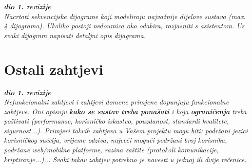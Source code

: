 				\textbf{\textit{dio 1. revizije}}\\
				
				\textit{Nacrtati sekvencijske dijagrame koji modeliraju najvažnije dijelove sustava (max. 4 dijagrama). Ukoliko postoji nedoumica oko odabira, razjasniti s asistentom. Uz svaki dijagram napisati detaljni opis dijagrama.}
				\eject
	
		\section{Ostali zahtjevi}
		
			\textbf{\textit{dio 1. revizije}}\\
		 
			 \textit{Nefunkcionalni zahtjevi i zahtjevi domene primjene dopunjuju funkcionalne zahtjeve. Oni opisuju \textbf{kako se sustav treba ponašati} i koja \textbf{ograničenja} treba poštivati (performanse, korisničko iskustvo, pouzdanost, standardi kvalitete, sigurnost...). Primjeri takvih zahtjeva u Vašem projektu mogu biti: podržani jezici korisničkog sučelja, vrijeme odziva, najveći mogući podržani broj korisnika, podržane web/mobilne platforme, razina zaštite (protokoli komunikacije, kriptiranje...)... Svaki takav zahtjev potrebno je navesti u jednoj ili dvije rečenice.}
			 
			 
			 
	